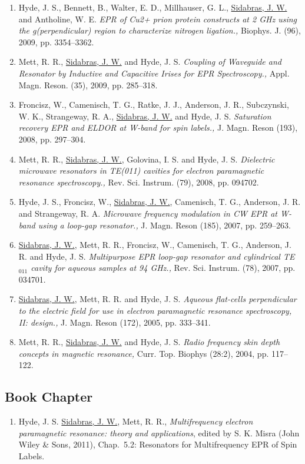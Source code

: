 \begin{enumerate}
    \item Hyde, J. S., Bennett, B., Walter, E. D., Millhauser, G. L., \underline{Sidabras, J. W.} and Antholine, W. E. \textit{EPR of Cu2+ prion protein constructs at 2 GHz using the g(perpendicular) region to characterize nitrogen ligation.,} Biophys. J. (96), 2009, pp. 3354--3362.
    \item Mett, R. R., \underline{Sidabras, J. W.} and Hyde, J. S. \textit{Coupling of Waveguide and Resonator by Inductive and Capacitive Irises for EPR Spectroscopy.,} Appl. Magn. Reson. (35), 2009, pp. 285--318.
    \item Froncisz, W., Camenisch, T. G., Ratke, J. J., Anderson, J. R., Subczynski, W. K., Strangeway, R. A., \underline{Sidabras, J. W.} and Hyde, J. S. \textit{Saturation recovery EPR and ELDOR at W-band for spin labels.,} J. Magn. Reson (193), 2008, pp. 297--304.
    \item Mett, R. R., \underline{Sidabras, J. W.}, Golovina, I. S. and Hyde, J. S. \textit{Dielectric microwave resonators in TE(011) cavities for electron paramagnetic resonance spectroscopy.,} Rev. Sci. Instrum. (79), 2008, pp. 094702.
    \item Hyde, J. S., Froncisz, W., \underline{Sidabras, J. W.}, Camenisch, T. G., Anderson, J. R. and Strangeway, R. A. \textit{Microwave frequency modulation in CW EPR at W-band using a loop-gap resonator.,} J. Magn. Reson (185), 2007, pp. 259--263.
    \item \underline{Sidabras, J. W.}, Mett, R. R., Froncisz, W., Camenisch, T. G., Anderson, J. R. and Hyde, J. S. \textit{Multipurpose EPR loop-gap resonator and cylindrical TE$_{011}$ cavity for aqueous samples at 94 GHz.,} Rev. Sci. Instrum. (78), 2007, pp. 034701.
    \item \underline{Sidabras, J. W.}, Mett, R. R. and Hyde, J. S. \textit{Aqueous flat-cells perpendicular to the electric field for use in electron paramagnetic resonance spectroscopy, II: design.,} J. Magn. Reson (172), 2005, pp. 333--341.
    \item Mett, R. R., \underline{Sidabras, J. W.} and Hyde, J. S. \textit{Radio frequency skin depth concepts in magnetic resonance,} Curr. Top. Biophys (28:2), 2004, pp. 117--122.
\end{enumerate}



\subsection*{Book Chapter}
\begin{enumerate}
\itemsep0em 
    \item Hyde, J. S. \underline{Sidabras, J. W.}, Mett, R. R., \textit{Multifrequency electron paramagnetic resonance: theory and applications}, edited by S. K. Misra (John Wiley \& Sons, 2011), Chap.~5.2: Resonators for Multifrequency EPR of Spin Labels.
\end{enumerate}

